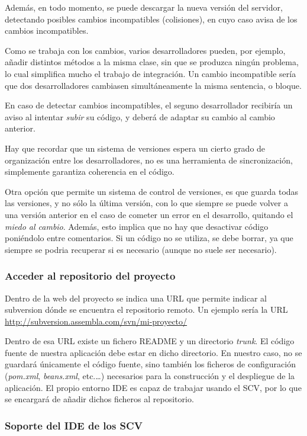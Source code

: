 \documentclass[11pt]{article}
\begin{document}
Además, en todo momento, se puede descargar la nueva versión del servidor,
detectando posibles cambios incompatibles (colisiones), en cuyo caso avisa de
los cambios incompatibles.

Como se trabaja con los cambios, varios desarrolladores pueden, por ejemplo,
añadir distintos métodos a la misma clase, sin que se produzca ningún problema,
lo cual simplifica mucho el trabajo de integración. Un cambio incompatible sería
que dos desarrolladores cambiasen simultáneamente la misma sentencia, o bloque.

En caso de detectar cambios incompatibles, el seguno desarrollador recibiría un
aviso al intentar \emph{subir} su código, y deberá de adaptar su cambio al
cambio anterior.

Hay que recordar que un sistema de versiones espera un cierto grado de
organización entre los desarrolladores, no es una herramienta de sincronización,
simplemente garantiza coherencia en el código.

Otra opción que permite un sistema de control de versiones, es que guarda todas
las versiones, y no sólo la última versión, con lo que siempre se puede volver a
una versión anterior en el caso de cometer un error en el desarrollo, quitando
el \emph{miedo al cambio}. Además, esto implica que no hay que desactivar código
poniéndolo entre comentarios. Si un código no se utiliza, se debe borrar, ya
que siempre se podria recuperar si es necesario (aunque no suele ser necesario).


\subsubsection{Acceder al repositorio del proyecto} \label{sec-7-2-1}

Dentro de la web del proyecto se indica una URL que permite indicar al
subversion dónde se encuentra el repositorio remoto. Un ejemplo sería la URL
\url{http://subversion.assembla.com/svn/mi-proyecto/}

Dentro de esa URL existe un fichero README y un directorio \emph{trunk}. El
código fuente de nuestra aplicación debe estar en dicho directorio. En nuestro
caso, no se guardará únicamente el código fuente, sino también los ficheros de
configuración (\emph{pom.xml}, \emph{beans.xml}, etc.\ldots{}) necesarios para la construcción y el despliegue de la aplicación. El propio entorno
IDE es capaz de trabajar usando el SCV, por lo que se encargará de añadir dichos
ficheros al repositorio.

\subsubsection{Soporte del IDE de los SCV}
\label{sec-7-2-2}
\end{document}
